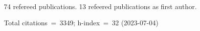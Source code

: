 74 refereed publications. 13 refeered publications as first author.

Total citations~=~3349; h-index~=~32 (2023-07-04)